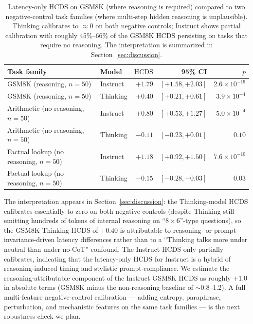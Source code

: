 \documentclass{article}
\theoremstyle{plain}
\theoremstyle{definition}
\theoremstyle{remark}
\begin{document}
\begin{table}[t]
\centering
\small
\begin{tabular}{llrrr}
\toprule
Task family & Model & $\overline{\mathrm{HCDS}}$ & 95\% CI & $p$ \\
\midrule
GSM8K (reasoning, $n=50$) & Instruct & $+1.79$ & $[+1.58, +2.03]$ & $2.6 \times 10^{-19}$ \\
GSM8K (reasoning, $n=50$) & Thinking & $+0.40$ & $[+0.21, +0.61]$ & $3.9 \times 10^{-4}$ \\
\midrule
Arithmetic (no reasoning, $n=50$) & Instruct & $+0.80$ & $[+0.53, +1.27]$ & $5.0 \times 10^{-4}$ \\
Arithmetic (no reasoning, $n=50$) & Thinking & $-0.11$ & $[-0.23, +0.01]$ & $0.10$ \\
Factual lookup (no reasoning, $n=50$) & Instruct & $+1.18$ & $[+0.92, +1.50]$ & $7.6 \times 10^{-10}$ \\
Factual lookup (no reasoning, $n=50$) & Thinking & $-0.15$ & $[-0.28, -0.03]$ & $0.03$ \\
\bottomrule
\end{tabular}
\caption{Latency-only HCDS on GSM8K (where reasoning is required)
compared to two negative-control task families (where multi-step
hidden reasoning is implausible). Thinking calibrates to
$\approx 0$ on both negative controls; Instruct shows partial
calibration with roughly 45\%--66\% of the GSM8K HCDS persisting on
tasks that require no reasoning. The interpretation is summarized in
Section~\ref{sec:discussion}.}
\label{tab:negative-control}
\end{table}

The interpretation appears in Section~\ref{sec:discussion}: the
Thinking-model HCDS calibrates essentially to zero on both negative
controls (despite Thinking still emitting hundreds of tokens of
internal reasoning on ``$8 \times 6$''-type questions), so the GSM8K
Thinking HCDS of $+0.40$ is attributable to reasoning- or
prompt-invariance-driven latency differences rather than to a
``Thinking talks more under neutral than under no-CoT'' confound.
The Instruct HCDS only partially calibrates, indicating that the
latency-only HCDS for Instruct is a hybrid of reasoning-induced
timing and stylistic prompt-compliance. We estimate the
reasoning-attributable component of the Instruct GSM8K HCDS as
roughly $+1.0$ in absolute terms (GSM8K minus the non-reasoning
baseline of $\sim$0.8--1.2). A full multi-feature negative-control
calibration --- adding entropy, paraphrase, perturbation, and
mechanistic features on the same task families --- is the next
robustness check we plan.
\end{document}
